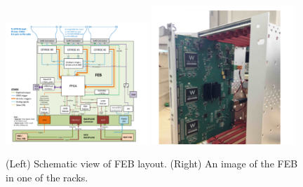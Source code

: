 \begin{figure}[h!]
	\centering
\includegraphics[width=0.48\textwidth]{figures/FEB.png}
\includegraphics[width=0.48\textwidth]{figures/FEB2.png}
\caption{(Left) Schematic view of FEB layout. (Right) An image of the FEB in one of the racks.}
\label{fig:FEB}
\end{figure}



